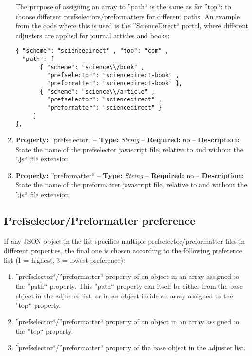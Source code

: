 \documentclass[
a4paper,
12pt,
]
{article}
\begin{document}
\begin{enumerate}
  The purpose of assigning an array to ''path`` is the same as for ''top``: to choose different prefselectors/preformatters for different paths. An example from the code where this is used is the ''ScienceDirect`` portal, where different adjusters are applied for journal articles and books:
  \begin{center}
  \begin{lstlisting}
{ "scheme": "sciencedirect" , "top": "com" ,
  "path": [
	   { "scheme": "science\\/book" , 
	     "prefselector": "sciencedirect-book" , 
	     "preformatter": "sciencedirect-book" },
	   { "scheme": "science\\/article" , 
	     "prefselector": "sciencedirect" , 
	     "preformatter": "sciencedirect" }
	 ]			
},
\end{lstlisting}
\end{center}

\item \textbf{Property:} ''prefselector`` -- \textbf{Type:} \textit{String} -- \textbf{Required:} no -- \textbf{Description:} State the name of the prefselector javascript file, relative to
and without the ''.js`` file extension.

\item \textbf{Property:} ''preformatter`` -- \textbf{Type:} \textit{String} -- \textbf{Required:} no -- \textbf{Description:} State the name of the preformatter javascript file, relative to
and without the ''.js`` file extension.
 \end{enumerate}
 
\subsection{Prefselector/Preformatter preference}
 If any JSON object in the list specifies multiple prefselector/preformatter files in different properties, the final one is chosen according to the following preference list (1 = highest, 3 = lowest preference):
 \begin{enumerate}
  \item ''prefselector``/''preformatter`` property of an object in an array assigned to the ''path`` property. This ''path`` property can itself be either from the base object in the adjuster list, or in an object inside an array assigned to the ''top`` property.
  
  \item ''prefselector``/''preformatter`` property of an object in an array assigned to the ''top`` property.
  
  \item ''prefselector``/''preformatter`` property of the base object in the adjuster list.
 \end{enumerate}
 
\end{document}
